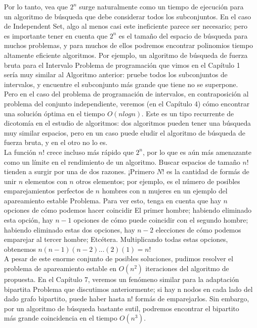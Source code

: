 \documentclass[a4paper, 12pt]{book}
\theoremstyle{dotless}
\begin{document}
Por lo tanto, vea que $2^n$ surge naturalmente como un tiempo de ejecución para un algoritmo de búsqueda que debe considerar todos los subconjuntos. En el caso de Independent Set, algo al menos casi este ineficiente parece ser necesario; pero es importante tener en cuenta que $2^n$ es el tamaño del espacio de búsqueda para muchos problemas, y para muchos de ellos podremos encontrar polinomios tiempo altamente eficiente algoritmos. Por ejemplo, un algoritmo de búsqueda de fuerza bruta para el
Intervalo Problema de programación que vimos en el Capítulo 1 sería muy similar al Algoritmo anterior: pruebe todos los subconjuntos de intervalos, y encuentre el subconjunto más grande que tiene no se superpone. Pero en el caso del problema de programación de intervalos, en contraposición al problema del conjunto independiente, veremos (en el Capítulo 4) cómo encontrar una solución óptima en el tiempo $O(n log n)$. Este es un tipo recurrente de dicotomía en el estudio de algoritmos: dos algoritmos pueden tener una búsqueda muy similar espacios, pero en un caso puede eludir el algoritmo de búsqueda de fuerza bruta, y en el otro no lo es.\\

La función $n!$ crece incluso más rápido que $2^n$, por lo que es aún más amenazante como un límite en el rendimiento de un algoritmo. Buscar espacios de tamaño $n!$ tienden a surgir por una de dos razones. ¡Primero $N$! es la cantidad de formás de unir $n$ elementos con $n$ otros elementos; por ejemplo, es el número de posibles emparejamientos perfectos de $n$ hombres con n mujeres en un ejemplo del apareamiento estable Problema. Para ver esto, tenga en cuenta que hay $n$ opciones de cómo podemos hacer coincidir El primer hombre; habiendo eliminado esta opción, hay $n-1$ opciones de cómo puede coincidir con el segundo hombre; habiendo eliminado estas dos opciones, hay $n-2$ elecciones de cómo podemos emparejar al tercer hombre; Etcétera. Multiplicando todas estas opciones, obtenemos $n(n-1)(n-2)...(2)(1)=n!$\\

A pesar de este enorme conjunto de posibles soluciones, pudimos resolver el problema de apareamiento estable en $O(n^2)$ iteraciones del algoritmo de propuesta.
En el Capítulo 7, veremos un fenómeno similar para la adaptación bipartita Problema que discutimos anteriormente; si hay n nodos en cada lado del dado grafo bipartito, puede haber hasta n! formás de emparejarlos. Sin embargo, por un algoritmo de búsqueda bastante sutil, podremos encontrar el bipartito más grande coincidencia en el tiempo $O(n^3)$.\\
\end{document}
